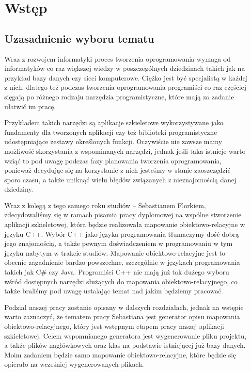 \documentclass[12pt]{report}
\begin{document}


\tableofcontents

\chapter{Wstęp} \label{wstep}

\section{Uzasadnienie wyboru tematu}

Wraz z rozwojem informatyki proces tworzenia oprogramowania wymaga od informatyków co raz większej wiedzy w poszczególnych dziedzinach takich jak na przykład bazy 
danych czy sieci komputerowe. Ciężko jest być specjalistą w każdej z nich, dlatego też podczas tworzenia oprogramowania programiści co raz częściej sięgają po różnego 
rodzaju narzędzia programistyczne, które mają za zadanie ułatwić im pracę. 

Przykładem takich narzędzi są aplikacje szkieletowe wykorzystywane jako fundamenty dla tworzonych aplikacji czy też biblioteki programistyczne udostępniające zestawy 
określonych funkcji. Oczywiście nie zawsze mamy możliwość skorzystania z wspominanych narzędzi, jednak jeśli taka istnieje warto wziąć to pod uwagę podczas fazy planowania 
tworzenia  oprogramowania, ponieważ decydując się na korzystanie z nich jesteśmy w stanie zaoszczędzić sporo czasu, a także uniknąć wielu błędów związanych z nieznajomością 
danej dziedziny.

Wraz z kolegą z tego samego roku studiów -- Sebastianem Florkiem, zdecydowaliśmy się w ramach pisamia pracy dyplomowej na wspólne stworzenie aplikacji szkieletowej, 
która będzie realizowała mapowanie obiektowo-relacyjne w języku C++. Wybór C++ jako języka programowania tłumaczymy dość dobrą jego znajomością, a także pewnym
doświadczeniem w programowaniu w tym języku nabytym w trakcie studiów. Mapowanie obiektowo-relacyjne jest to obecnie zagadnienie bardzo powszechne, szczególnie w 
językach programowania takich jak C\# czy Java. Programiści C++ nie mają już tak dużego wyboru wśród dostępnych narzędzi służących do mapowania 
obiektowo-relacyjnego, co także braliśmy pod uwagę ustalając temat nad jakim będziemy pracować.

Podział naszej pracy zostanie opisany w dalszych rozdziałach, jednak na wstępie warto zaznaczyć, że tematem pracy Sebastiana jest generator opisu mapowania 
obiektowo-relacyjnego, który jest wstępnym etapem pracy naszej aplikacji szkieletowej. Celem wspomnianego generatora jest wygenerowanie pliku projektu, a także plików
nagłówkowych oraz klas na podstawie istniejącej już bazy danych. Moim zadaniem będzie samo mapowanie obiektowo-relacyjne, które będzie się opierało na wcześniej
wygenerowanych plikach. 
\end{document}
